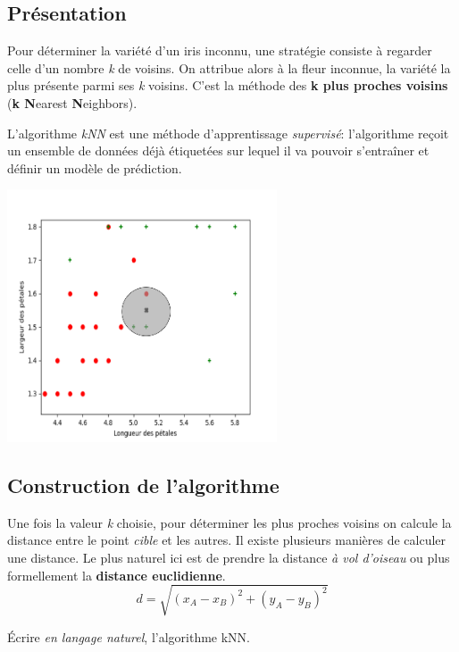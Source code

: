 \documentclass[a4paper,11pt]{article}
\begin{document}
\subsection{Présentation}
Pour déterminer la variété d'un iris inconnu, une stratégie consiste à regarder celle d'un nombre \emph{k} de voisins. On attribue alors à la fleur inconnue, la variété la plus présente parmi ses \emph{k} voisins. C'est la méthode des \textbf{k plus proches voisins} (\textbf{k N}earest \textbf{N}eighbors).
\begin{aretenir}[Complément]
L'algorithme \emph{kNN} est une méthode d'apprentissage \emph{supervisé}: l'algorithme reçoit un ensemble de données déjà étiquetées sur lequel il va pouvoir s’entraîner et définir un modèle de prédiction. 
\end{aretenir}
\begin{center}
\centering
\includegraphics[width=8cm]{ressources/zoom-k3.png}
\label{IMG}
\end{center}

\subsection{Construction de l'algorithme}
Une fois la valeur \emph{k} choisie, pour déterminer les plus proches voisins on calcule la distance entre le point \emph{cible} et les autres. Il existe plusieurs manières de calculer une distance. Le plus naturel ici est de prendre la distance \emph{à vol d'oiseau} ou plus formellement la \textbf{distance euclidienne}.
$$d=\sqrt{(x_A-x_B)^2+(y_A-y_B)^2}$$
\begin{activite}
Écrire \emph{en langage naturel}, l'algorithme kNN.

\end{activite}
\end{document}
